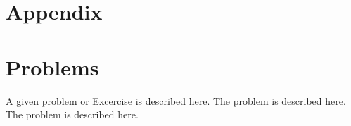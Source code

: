 %
\section*{Appendix}




\section*{Problems}
%
\begin{prob}
\label{prob1}
A given problem or Excercise is described here. The
problem is described here. The problem is described here.
\end{prob}



